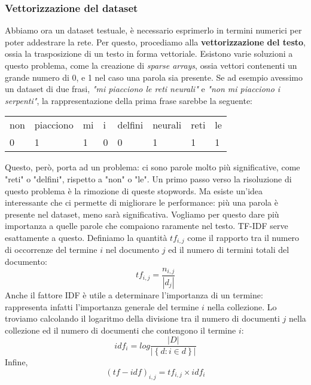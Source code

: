 \subsubsection{Vettorizzazione del dataset}
Abbiamo ora un dataset testuale, è necessario esprimerlo in termini numerici per poter addestrare la rete. Per questo, procediamo alla \textbf{vettorizzazione del testo}, ossia la trasposizione di un testo in forma vettoriale. Esistono varie soluzioni a questo problema, come la creazione di \textit{sparse arrays}, ossia vettori contenenti un grande numero di 0, e 1 nel caso una parola sia presente.
Se ad esempio avessimo un dataset di due frasi, \textit{"mi piacciono le reti neurali"} e \textit{"non mi piacciono i serpenti"}, la rappresentazione della prima frase sarebbe la seguente:
\begin{table}[]
    \begin{tabular}{llllllll}
        non & piacciono & mi & i & delfini & neurali & reti & le \\
        0   & 1         & 1  & 0 & 0       & 1       & 1    & 1
    \end{tabular}
\end{table}
Questo, però, porta ad un problema: ci sono parole molto più significative, come "reti" o "delfini", rispetto a "non" o "le". Un primo passo verso la risoluzione di questo problema è la rimozione di queste stopwords. Ma esiste un'idea interessante che ci permette di migliorare le performance: più una parola è presente nel dataset, meno sarà significativa. Vogliamo per questo dare più importanza a quelle parole che compaiono raramente nel testo. TF-IDF serve esattamente a questo. Definiamo la quantità $tf_{i,j}$ come il rapporto tra il numero di occorrenze del termine $i$ nel documento $j$ ed il numero di termini totali del documento:
\begin{displaymath}
    tf_{i,j}=\frac{n_{i,j}}{|d_j|}
\end{displaymath}
Anche il fattore IDF è utile a determinare l'importanza di un termine: rappresenta infatti l'importanza generale del termine $i$ nella collezione. Lo troviamo calcolando il logaritmo della divisione tra il numero di documenti $j$ nella collezione ed il numero di documenti che contengono il termine $i$:
\begin{displaymath}
    idf_i=log\frac{|D|}{|\left\{d:i\in d\right\}|}
\end{displaymath}
Infine,
\begin{displaymath}
    (tf-idf)_{i,j} = tf_{i,j} \times idf_i
\end{displaymath}
